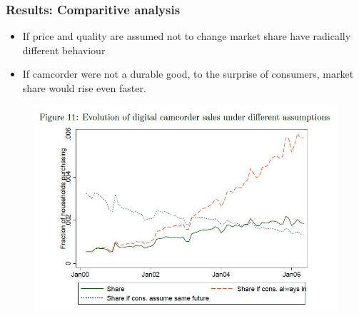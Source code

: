 \documentclass{beamer}
\theoremstyle{definition}
\begin{document}




\begin{frame}
  \frametitle{Results: Comparitive analysis}

  \begin{itemize}
    \item If price and quality are assumed not to change market share have
      radically different behaviour
    \item If camcorder were not a durable good, to the surprise of consumers,
      market share would rise even faster.
  \end{itemize}

  \begin{figure}
    \includegraphics[width=\linewidth]{11.JPG}
  \end{figure}
\end{frame}
\end{document}
